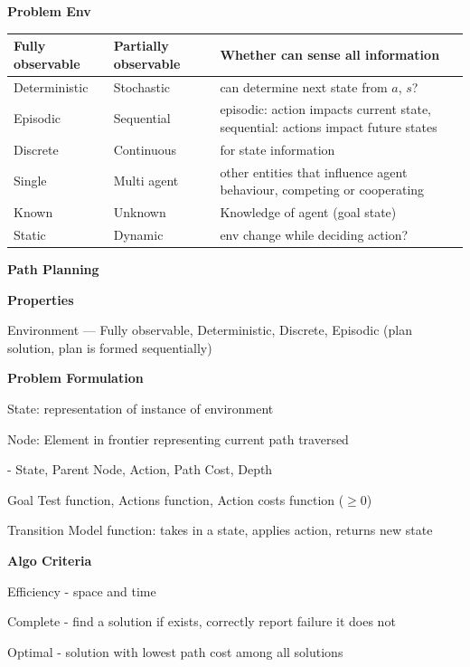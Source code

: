 \documentclass[10pt, a4paper]{article}
\newcommand{\blue}[1]{{\color{MidnightBlue}#1}}
\newcommand{\green}[1]{{\color{PineGreen}#1}}
\newcommand{\header}[1]{{\normalsize\textbf{#1}}}
\newcommand{\tab}[0]{\hspace*{2mm}}
\begin{document}
\begin{multicols*}{3}



		\textbf{Problem Env}

	  	\begin{tabular}{ | m{1.5cm} | m{1.5cm} | m{5cm} | }
		\hline
		Fully observable & Partially observable & Whether can sense all information\\
		\hline
		Deterministic & Stochastic & can determine next state from $a$, $s$? \\
		\hline
		Episodic & Sequential & episodic: action impacts current state, sequential: actions impact future states\\
		\hline
		Discrete & Continuous & for state information\\
		\hline
		Single & Multi agent & other entities that influence agent behaviour, competing or cooperating\\
		\hline
		Known & Unknown & Knowledge of agent (goal state)\\
		\hline
		Static & Dynamic & env change while deciding action?\\
		\hline
	  	\end{tabular}

	  	\header{Path Planning}

	  	\textbf{Properties}

	  	Environment --- Fully observable, Deterministic, Discrete, Episodic (plan solution, plan is formed sequentially)

		\textbf{Problem Formulation}

		State: representation of instance of environment

		Node: Element in frontier representing current path traversed

		\tab - State, Parent Node, Action, Path Cost, Depth

		Goal Test function, Actions function, Action costs function ($\geq 0$)

		Transition Model function: takes in a state, applies action, returns new state

		\textbf{Algo Criteria}

		Efficiency - space and time

		\green{Complete} - find a solution if exists, correctly report failure it does not

		\green{Optimal} - solution with \blue{lowest} path cost among all solutions


\end{multicols*}
\end{document}
